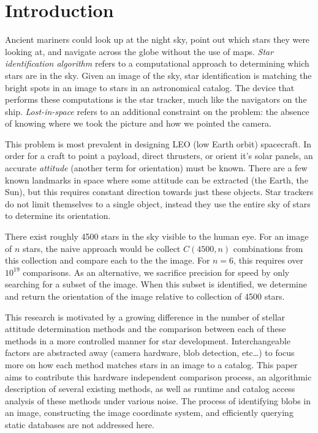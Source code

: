 \section{Introduction}\label{sec:introduction}
Ancient mariners could look up at the night sky, point out which stars they were looking at, and navigate across the
globe without the use of maps.
\textit{Star identification algorithm} refers to a computational approach to determining which stars are in the sky.
Given an image of the sky, star identification is matching the bright spots in an image to stars in an astronomical
catalog.
The device that performs these computations is the star tracker, much like the navigators on the ship.
\textit{Lost-in-space} refers to an additional constraint on the problem: the absence of knowing where we took
the picture and how we pointed the camera.

This problem is most prevalent in designing LEO (low Earth orbit) spacecraft.
In order for a craft to point a payload, direct thrusters, or orient it's solar panels, an accurate
\textit{attitude} (another term for orientation) must be known.
There are a few known landmarks in space where some attitude can be extracted (the Earth, the Sun), but this
requires constant direction towards just these objects.
Star trackers do not limit themselves to a single object, instead they use the entire sky of stars to determine its
orientation.

There exist roughly 4500 stars in the sky visible to the human eye.
For an image of $n$ stars, the naive approach would be collect $C(4500, n)$ combinations from this collection and
compare each to the the image.
For $n = 6$, this requires over $10^{19}$ comparisons.
As an alternative, we sacrifice precision for speed by only searching for a subset of the image.
When this subset is identified, we determine and return the orientation of the image relative to collection of 4500
stars.

This research is motivated by a growing difference in the number of stellar attitude determination methods and the
comparison between each of these methods in a more controlled manner for star development.
Interchangeable factors are abstracted away (camera hardware, blob detection, etc\ldots) to focus more on how each
method matches stars in an image to a catalog.
This paper aims to contribute this hardware independent comparison process, an algorithmic description of several
existing methods, as well as runtime and catalog access analysis of these methods under various noise.
The process of identifying blobs in an image, constructing the image coordinate system, and efficiently querying
static databases are not addressed here.
